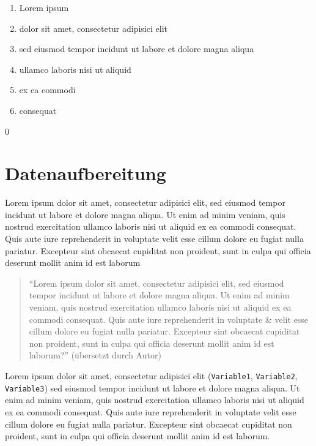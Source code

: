 \documentclass[12pt, a4paper, oneside]{article}
\begin{document}
\renewcommand{\labelenumi}{\roman{enumi})}
\begin{enumerate}
\item Lorem ipsum
\item dolor sit amet, consectetur adipisici elit
\item sed eiusmod tempor incidunt ut labore et dolore magna aliqua
\item ullamco laboris nisi ut aliquid
\item ex ea commodi
\item consequat
\end{enumerate}

\setcounter {footnote} {0}
\section{Datenaufbereitung}
Lorem ipsum dolor sit amet, consectetur adipisici elit, sed eiusmod tempor incidunt ut labore et dolore magna aliqua. Ut enim ad minim veniam, quis nostrud exercitation ullamco laboris nisi ut aliquid ex ea commodi consequat. Quis aute iure reprehenderit in voluptate velit esse cillum dolore eu fugiat nulla pariatur. Excepteur sint obcaecat cupiditat non proident, sunt in culpa qui officia deserunt mollit anim id est laborum
%
\begin{quote}
"`Lorem ipsum dolor sit amet, consectetur adipisici elit, sed eiusmod tempor incidunt ut labore et dolore magna aliqua. Ut enim ad minim veniam, quis nostrud exercitation ullamco laboris nisi ut aliquid ex ea commodi consequat. Quis aute iure reprehenderit in voluptate \& velit esse cillum dolore eu fugiat nulla pariatur. Excepteur sint obcaecat cupiditat non proident, sunt in culpa qui officia deserunt mollit anim id est laborum?"' (übersetzt durch Autor)
\end{quote}
%
Lorem ipsum dolor sit amet, consectetur adipisici elit (\texttt{Variable1}, \texttt{Variable2}, \texttt{Variable3}) sed eiusmod tempor incidunt ut labore et dolore magna aliqua. Ut enim ad minim veniam, quis nostrud exercitation ullamco laboris nisi ut aliquid ex ea commodi consequat. Quis aute iure reprehenderit in voluptate velit esse cillum dolore eu fugiat nulla pariatur. Excepteur sint obcaecat cupiditat non proident, sunt in culpa qui officia deserunt mollit anim id est laborum.
\newpage
\end{document}
